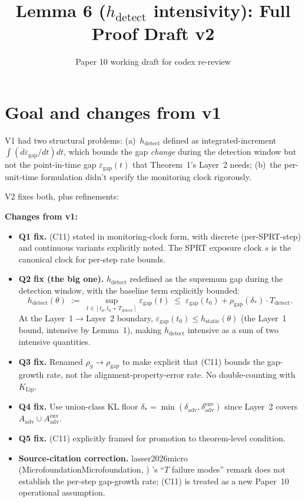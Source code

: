 \documentclass{article}
\title{Lemma 6 ($h_{\mathrm{detect}}$ intensivity): Full Proof Draft v2}
\author{Paper 10 working draft for codex re-review}
\date{}
\makeatletter
\newcommand{\citep}[2][]{%
  \begingroup
  \def\@tmpkey{#2}%
  \ifx\@tmpkey\@empty\else
    (\ifx\@empty#1\@empty\else #1, \fi
     \@nameuse{bibkey@\@tmpkey})%
  \fi
  \endgroup
}
\newcommand{\Aadv}{A_{\mathrm{adv}}}
\newcommand{\deltaadv}{\delta_{\mathrm{adv}}}
\newcommand{\deltastar}{\delta_{*}}
\newcommand{\rhogap}{\rho_{\mathrm{gap}}}
\newcommand{\epsgap}{\varepsilon_{\mathrm{gap}}}
\makeatother
\begin{document}
\maketitle

\section{Goal and changes from v1}

V1 had two structural problems:
(a)~$h_{\mathrm{detect}}$ defined as integrated-increment $\int (d\epsgap/dt) dt$,
which bounds the gap \emph{change} during the detection window but
not the point-in-time gap $\epsgap(t)$ that Theorem~1's Layer~2
needs;
(b)~the per-unit-time formulation didn't specify the monitoring
clock rigorously.

V2 fixes both, plus refinements:

\textbf{Changes from v1:}
\begin{itemize}
\item \textbf{Q1 fix.}  (C11) stated in monitoring-clock form, with
  discrete (per-SPRT-step) and continuous variants explicitly
  noted.  The SPRT exposure clock $s$ is the canonical clock for
  per-step rate bounds.
\item \textbf{Q2 fix (the big one).}  $h_{\mathrm{detect}}$
  redefined as the supremum gap during the detection window, with
  the baseline term explicitly bounded:
  \[
    h_{\mathrm{detect}}(\theta) \;:=\; \sup_{t \in
    [t_0, t_0+T_{\mathrm{detect}}]} \epsgap(t)
    \;\leq\; \epsgap(t_0) + \rhogap(\deltastar) \cdot
    T_{\mathrm{detect}}.
  \]
  At the Layer~1$\to$Layer~2 boundary, $\epsgap(t_0) \leq
  h_{\mathrm{static}}(\theta)$ (the Layer~1 bound, intensive by
  Lemma~1), making $h_{\mathrm{detect}}$ intensive as a sum of two
  intensive quantities.
\item \textbf{Q3 fix.}  Renamed $\rho_g \to \rhogap$ to make
  explicit that (C11) bounds the gap-growth rate, not the
  alignment-property-error rate.  No double-counting with
  $K_{\mathrm{Lip}}$.
\item \textbf{Q4 fix.}  Use union-class KL floor $\deltastar =
  \min(\deltaadv, \delta_{\mathrm{adv}}^{\mathrm{env}})$ since
  Layer~2 covers $\Aadv \cup \Aadv^{\mathrm{env}}$.
\item \textbf{Q5 fix.}  (C11) explicitly framed for promotion to
  theorem-level condition.
\item \textbf{Source-citation correction.}
  \citep[Microfoundation]{lasser2026micro}'s ``$T$ failure modes''
  remark does not establish the per-step gap-growth rate; (C11) is
  treated as a new Paper~10 operational assumption.
\end{itemize}
\end{document}
